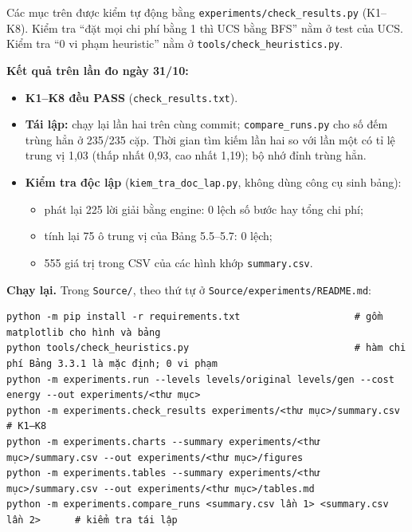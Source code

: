 Các mục trên được kiểm tự động bằng \texttt{experiments/\allowbreak{}check\_\allowbreak{}results.\allowbreak{}py} (K1--K8). Kiểm tra ``đặt mọi chi phí bằng 1 thì UCS bằng BFS'' nằm ở test của UCS. Kiểm tra ``0 vi phạm heuristic'' nằm ở \texttt{tools/\allowbreak{}check\_\allowbreak{}heuristics.\allowbreak{}py}.

\textbf{Kết quả trên lần đo ngày 31/10:}

\begin{itemize}
\tightlist
\item
  \textbf{K1--K8 đều PASS} (\texttt{check\_\allowbreak{}results.\allowbreak{}txt}).
\item
  \textbf{Tái lập:} chạy lại lần hai trên cùng commit; \texttt{compare\_\allowbreak{}runs.\allowbreak{}py} cho số đếm trùng hẳn ở 235/235 cặp. Thời gian tìm kiếm lần hai so với lần một có tỉ lệ trung vị 1,03 (thấp nhất 0,93, cao nhất 1,19); bộ nhớ đỉnh trùng hẳn.
\item
  \textbf{Kiểm tra độc lập} (\texttt{kiem\_\allowbreak{}tra\_\allowbreak{}doc\_\allowbreak{}lap.\allowbreak{}py}, không dùng công cụ sinh bảng):

  \begin{itemize}
  \tightlist
  \item
    phát lại 225 lời giải bằng engine: 0 lệch số bước hay tổng chi phí;
  \item
    tính lại 75 ô trung vị của Bảng 5.5--5.7: 0 lệch;
  \item
    555 giá trị trong CSV của các hình khớp \texttt{summary.\allowbreak{}csv}.
  \end{itemize}
\end{itemize}

\textbf{Chạy lại.} Trong \texttt{Source/\allowbreak{}}, theo thứ tự ở \texttt{Source/\allowbreak{}experiments/\allowbreak{}README.\allowbreak{}md}:

\begin{verbatim}
python -m pip install -r requirements.txt                    # gồm matplotlib cho hình và bảng
python tools/check_heuristics.py                             # hàm chi phí Bảng 3.3.1 là mặc định; 0 vi phạm
python -m experiments.run --levels levels/original levels/gen --cost energy --out experiments/<thư mục>
python -m experiments.check_results experiments/<thư mục>/summary.csv          # K1–K8
python -m experiments.charts --summary experiments/<thư mục>/summary.csv --out experiments/<thư mục>/figures
python -m experiments.tables --summary experiments/<thư mục>/summary.csv --out experiments/<thư mục>/tables.md
python -m experiments.compare_runs <summary.csv lần 1> <summary.csv lần 2>      # kiểm tra tái lập
\end{verbatim}

